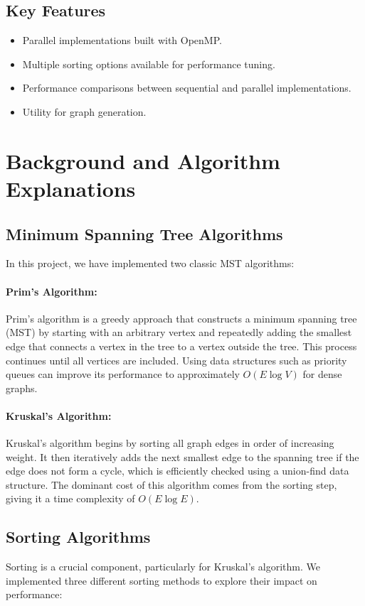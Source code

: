 \documentclass[11pt]{article}
\begin{document}
\subsection{Key Features}
\begin{itemize}
    \item Parallel implementations built with OpenMP.
    \item Multiple sorting options available for performance tuning.
    \item Performance comparisons between sequential and parallel implementations.
    \item Utility for graph generation.
\end{itemize}

\section{Background and Algorithm Explanations}
\subsection{Minimum Spanning Tree Algorithms}
In this project, we have implemented two classic MST algorithms:

\paragraph{Prim's Algorithm:} 
Prim's algorithm is a greedy approach that constructs a minimum spanning tree (MST) by starting with an arbitrary vertex and repeatedly adding the smallest edge that connects a vertex in the tree to a vertex outside the tree. This process continues until all vertices are included. Using data structures such as priority queues can improve its performance to approximately $O(E \log V)$ for dense graphs.

\paragraph{Kruskal's Algorithm:} 
Kruskal's algorithm begins by sorting all graph edges in order of increasing weight. It then iteratively adds the next smallest edge to the spanning tree if the edge does not form a cycle, which is efficiently checked using a union-find data structure. The dominant cost of this algorithm comes from the sorting step, giving it a time complexity of $O(E \log E)$.

\subsection{Sorting Algorithms}
Sorting is a crucial component, particularly for Kruskal's algorithm. We implemented three different sorting methods to explore their impact on performance:
\end{document}
